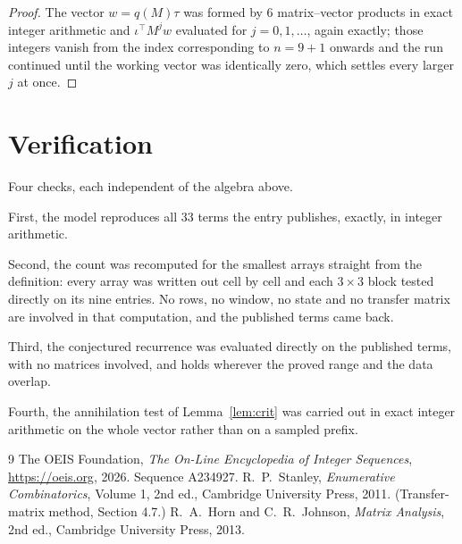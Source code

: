 \documentclass[11pt,a4paper]{article}
\theoremstyle{plain}
\theoremstyle{definition}
\begin{document}
\begin{proof}
The vector $w=q(M)\tau$ was formed by $6$ matrix--vector products in exact integer
arithmetic and $\iota^{\!\top}M^{j}w$ evaluated for $j=0,1,\dots$, again exactly; those
integers vanish from the index corresponding to $n=9+1$ onwards and the run continued
until the working vector was identically zero, which settles every larger $j$ at once.
\end{proof}

\section{Verification}

Four checks, each independent of the algebra above.

First, the model reproduces all $33$ terms the entry publishes, exactly, in integer
arithmetic.

Second, the count was recomputed for the smallest arrays straight from the definition: every
array was written out cell by cell and each $3\times3$ block tested directly on its nine
entries. No rows, no window, no state and no transfer matrix are involved in that computation,
and the published terms came back.

Third, the conjectured recurrence was evaluated directly on the published terms, with no
matrices involved, and holds wherever the proved range and the data overlap.

Fourth, the annihilation test of Lemma~\ref{lem:crit} was carried out in exact integer
arithmetic on the whole vector rather than on a sampled prefix.

\begin{thebibliography}{9}
 The OEIS Foundation, \emph{The On-Line Encyclopedia of Integer
Sequences}, \url{https://oeis.org}, 2026. Sequence A234927.
 R.~P.~Stanley, \emph{Enumerative Combinatorics}, Volume 1, 2nd ed.,
Cambridge University Press, 2011. (Transfer-matrix method, Section 4.7.)
 R.~A.~Horn and C.~R.~Johnson, \emph{Matrix Analysis}, 2nd ed., Cambridge
University Press, 2013.
\end{thebibliography}
\end{document}
